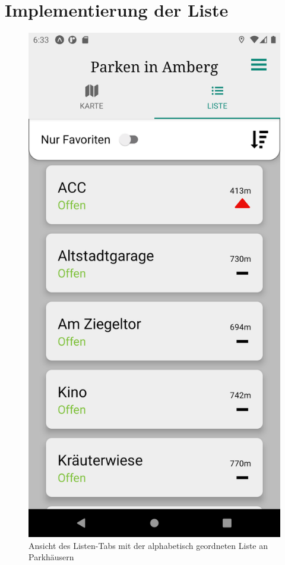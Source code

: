 \chapter{Implementierung der Liste}
\label{chap:4}

\begin{figure}
	\vspace{-\baselineskip}
	\centering
	\includegraphics[scale=0.15]{img/list}
	\caption{Ansicht des Listen-Tabs mit der alphabetisch geordneten Liste an Parkhäusern}
	\label{fig:list}
\end{figure}
